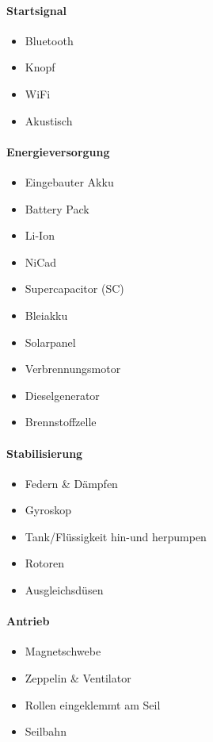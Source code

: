 \documentclass[a4paper]{report}
\begin{document}
\begin{multicols}{2}
\paragraph{Startsignal}
\begin{itemize}[noitemsep]
	\item Bluetooth
	\item Knopf
	\item WiFi
	\item Akustisch
\end{itemize}

\paragraph{Energieversorgung}
\begin{itemize}[noitemsep]
	\item Eingebauter Akku
	\item Battery Pack
	\item Li-Ion
	\item NiCad
	\item Supercapacitor (SC)
	\item Bleiakku
	\item Solarpanel
	\item Verbrennungsmotor
	\item Dieselgenerator
	\item Brennstoffzelle
\end{itemize}

\paragraph{Stabilisierung}
\begin{itemize}[noitemsep]
	\item Federn \& Dämpfen
	\item Gyroskop
	\item Tank/Flüssigkeit hin-und herpumpen
	\item Rotoren
	\item Ausgleichsdüsen
\end{itemize}

\paragraph{Antrieb}
\begin{itemize}[noitemsep]
	\item Magnetschwebe
	\item Zeppelin \& Ventilator
	\item Rollen eingeklemmt am Seil
	\item Seilbahn
\end{itemize}


\end{multicols}
\end{document}
